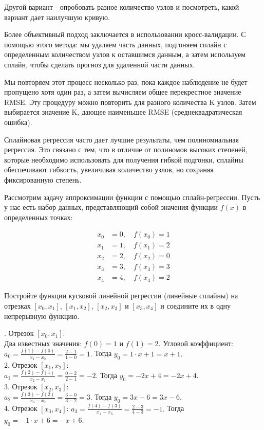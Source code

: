 {Другой вариант - опробовать разное количество узлов и посмотреть, какой вариант дает наилучшую кривую.

Более объективный подход заключается в использовании кросс-валидации. С помощью этого метода: мы удаляем часть данных, подгоняем сплайн с определенным количеством узлов к оставшимся данным, а затем используем сплайн, чтобы сделать прогноз для удаленной части данных.

Мы повторяем этот процесс несколько раз, пока каждое наблюдение не будет пропущено хотя один раз, а затем вычисляем общее перекрестное значение RMSE. Эту процедуру можно повторить для разного количества K узлов. Затем выбирается значение K, дающее наименьшее RMSE (среднеквадратическая ошибка).

Сплайновая регрессия часто дает лучшие результаты, чем полиномиальная регрессия. Это связано с тем, что в отличие от полиномов высоких степеней, которые необходимо использовать для получения гибкой подгонки, сплайны обеспечивают гибкость, увеличивая количество узлов, но сохраняя фиксированную степень.


\problem Рассмотрим задачу аппроксимации функции с помощью сплайн-регрессии. Пусть у нас есть набор данных, представляющий собой значения функции \(f(x)\) в определенных точках:

\begin{align*}
    x_0 & = 0, \quad f(x_0) = 1 \\
    x_1 & = 1, \quad f(x_1) = 2 \\
    x_2 & = 2, \quad f(x_2) = 0 \\
    x_3 & = 3, \quad f(x_3) = 3 \\
    x_4 & = 4, \quad f(x_4) = 2
\end{align*}

Постройте функции кусковой линейной регрессии (линейные сплайны) на отрезках \([x_0, x_1]\), \([x_1, x_2]\), \([x_2, x_3]\) и \([x_3, x_4]\) и соедините их в одну непрерывную функцию.

. Отрезок \([x_0, x_1]\):\\
Два известных значения: \(f(0) = 1\) и \(f(1) = 2\). Угловой коэффициент:
$\displaystyle     a_0 = \frac{f(1) - f(0)}{x_1 - x_0} = \frac{2 - 1}{1 - 0} = 1.$ Тогда $y_0 = 1 \cdot x + 1 = x + 1.$\\
2. Отрезок \([x_1, x_2]\):\\
$\displaystyle     a_1 = \frac{f(2) - f(1)}{x_2 - x_1} = \frac{0 - 2}{2 - 1} = -2.$ Тогда $y_0 = -2 x + 4 = -2x + 4.$\\
3. Отрезок \([x_2, x_3]\):\\
$\displaystyle     a_2 = \frac{f(3) - f(2)}{x_3 - x_2} = \frac{3 - 0}{3 - 2} = 3.$ Тогда $y_0 = 3x - 6 = 3x-6.$\\
4. Отрезок \([x_3, x_4]\):
$\displaystyle     a_3 = \frac{f(4) - f(3)}{x_4 - x_3} = \frac{2 - 3}{4 - 3} = -1.$ Тогда $y_0 = -1\cdot x + 6 = -x + 6.$

}
